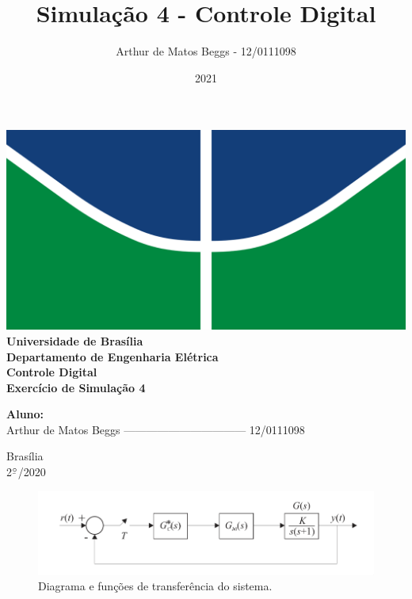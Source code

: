\documentclass{article}
\title{Simulação 4 - Controle Digital}
\author{Arthur de Matos Beggs - 12/0111098}
\date{2021}
\newcommand{\ubar}[1]{\underaccent{\bar}{#1}}
\begin{document}
\begin{titlepage}
    \begin{center}
        \centering
        \includegraphics[width=.7\linewidth]{images/logo_unb.png}\\[0.5cm]
        {\large \textbf{Universidade de Brasília}}\\[0.2cm]
        {\large \textbf{Departamento de Engenharia Elétrica}}\\[0.2cm]
        {\large \textbf{Controle Digital}}\\[4.8cm]
        {\bf \huge {Exercício de Simulação 4}}\\[0.2cm]
        {\bf \large {}}
    \end{center}

    \vspace{5cm}
    \hspace{2cm} {\noindent \bf \large {Aluno:}}\\
    \vspace{0.8cm}
    \hspace{2.35cm} {\large Arthur de Matos Beggs --------------------------------- 12/0111098}\\[1cm]

    \begin{center}
        {\large Brasília}\\
        {\large 2$^{\ubar{\circ}}$/2020}
    \end{center}

\end{titlepage}

\clearpage %

\setcounter{page}{2}

    \begin{figure}[H]
       \centering
            \includegraphics[width=1\linewidth]{images/diagrama.png}
            \caption{Diagrama e funções de transferência do sistema.}
            \label{fig:diagram}
    \end{figure}
\end{document}
